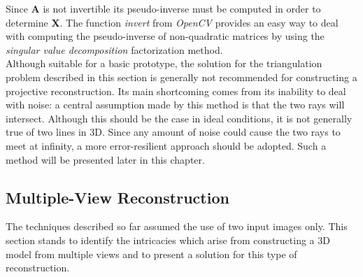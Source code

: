 \documentclass[12pt,a4paper,twoside,openright]{report}
\begin{document}
Since \textbf{A} is not invertible its pseudo-inverse must be computed in order to determine \textbf{X}. The function \emph{invert} from \emph{OpenCV} provides an easy way to deal with computing the pseudo-inverse of non-quadratic matrices by using the \emph{singular value decomposition}\cite[p.~82]{Suli+2003} factorization method.\\
\linebreak
Although suitable for a basic prototype, the solution for the triangulation problem described in this section is generally not recommended for constructing a projective reconstruction. Its main shortcoming comes from its inability to deal with noise: a central assumption made by this method is that the two rays will intersect. Although this should be the case in ideal conditions, it is not generally true of two lines in 3D. Since any amount of noise could cause the two rays to meet at infinity, a more error-resilient approach should be adopted. Such a method will be presented later in this chapter.


\subsection{Multiple-View Reconstruction}
The techniques described so far assumed the use of two input images only. This section stands to identify the intricacies which arise from constructing a 3D model from multiple views and to present a solution for this type of reconstruction.
\end{document}
